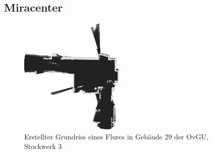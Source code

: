 \subsection{Miracenter}\label{sec:Mira}
\begin{figure}
\centering
\includegraphics[scale=1.1]{Bilder/Flur}
\caption{Erstellter Grundriss eines Flures in Gebäude 29 der OvGU, Stockwerk 3}
\label{fig:Flur}
\end{figure}
